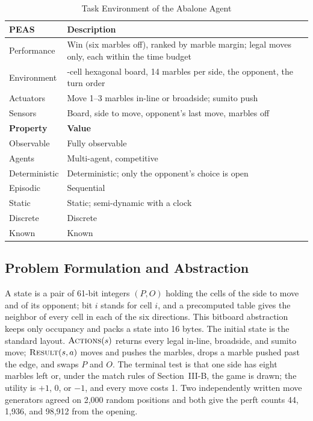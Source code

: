 \documentclass[conference,a4paper]{IEEEtran}
\begin{document}
\begin{table}[!b]
\caption{Task Environment of the Abalone Agent}
\label{tab:peas}
\centering
\footnotesize
\begin{tabular}{@{}>{\raggedright\arraybackslash}p{0.78in}>{\raggedright\arraybackslash}p{2.53in}@{}}
\hline
\textbf{PEAS} & \textbf{Description} \\
\hline
Performance & Win (six marbles off), ranked by marble margin; legal moves only, each within the time budget \\
Environment & 61-cell hexagonal board, 14 marbles per side, the opponent, the turn order \\
Actuators & Move 1--3 marbles in-line or broadside; sumito push \\
Sensors & Board, side to move, opponent's last move, marbles off \\
\hline
\textbf{Property} & \textbf{Value} \\
\hline
Observable & Fully observable \\
Agents & Multi-agent, competitive \\
Deterministic & Deterministic; only the opponent's choice is open \\
Episodic & Sequential \\
Static & Static; semi-dynamic with a clock \\
Discrete & Discrete \\
Known & Known \\
\hline
\end{tabular}
\end{table}

\subsection{Problem Formulation and Abstraction}
A state is a pair of 61-bit integers $(P,O)$ holding the cells of the side to move and of its opponent; bit $i$ stands for cell $i$, and a precomputed table gives the neighbor of every cell in each of the six directions. This bitboard abstraction keeps only occupancy and packs a state into 16 bytes. The initial state is the standard layout. $\textsc{Actions}(s)$ returns every legal in-line, broadside, and sumito move; $\textsc{Result}(s,a)$ moves and pushes the marbles, drops a marble pushed past the edge, and swaps $P$ and $O$. The terminal test is that one side has eight marbles left or, under the match rules of Section~III-B, the game is drawn; the utility is $+1$, $0$, or $-1$, and every move costs 1. Two independently written move generators agreed on 2,000 random positions and both give the perft counts 44, 1,936, and 98,912 from the opening.
\end{document}
